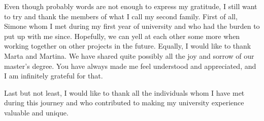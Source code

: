 Even though probably words are not enough to express my gratitude, I still want to try and thank the members of what I call my second family.
First of all, Simone whom I met during my first year of university and who had the burden to put up with me since.
Hopefully, we can yell at each other some more when working together on other projects in the future.
Equally, I would like to thank Marta and Martina.
We have shared quite possibly all the joy and sorrow of our master's degree.
You have always made me feel understood and appreciated, and I am infinitely grateful for that.

Last but not least, I would like to thank all the individuals whom I have met during this journey and who contributed to making my university experience valuable and unique.


